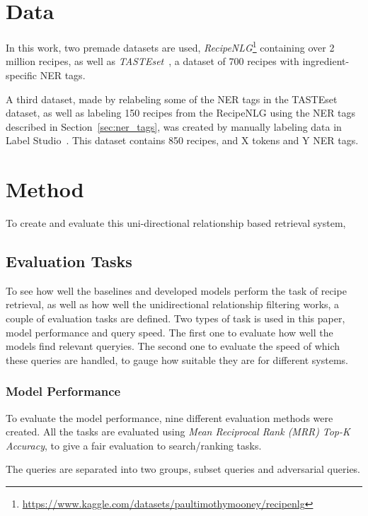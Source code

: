 \documentclass[11pt]{article}
\begin{document}
\section{Data}
In this work, two premade datasets are used,
\emph{RecipeNLG}\footnote{\url{https://www.kaggle.com/datasets/paultimothymooney/recipenlg}}
containing over 2 million recipes, as well as
\emph{TASTEset}~\cite{TASTEset}, a dataset of
700 recipes with ingredient-specific NER tags.

A third dataset, made by relabeling some of the NER tags in the TASTEset dataset,
as well as labeling 150 recipes from the RecipeNLG using the NER tags
described in Section~\ref{sec:ner_tags}, was created by manually labeling
data in Label Studio~\cite{LabelStudio}.
This dataset contains 850 recipes, and X tokens and Y NER tags.

\section{Method}
To create and evaluate this uni-directional relationship based retrieval system, 

\subsection{Evaluation Tasks}
To see how well the baselines and developed models perform the task of recipe
retrieval, as well as how well the unidirectional relationship filtering works,
a couple of evaluation tasks are defined.
Two types of task is used in this paper, model performance and query speed.
The first one to evaluate how well the models find relevant queryies.
The second one to evaluate the speed of which these queries are handled, to
gauge how suitable they are for different systems.

\subsubsection{Model Performance}\label{sec:modelperfomance}
To evaluate the model performance, nine different evaluation methods were
created.
All the tasks are evaluated using \emph{Mean Reciprocal Rank (MRR)} \emph{Top-K
Accuracy}, to give a fair evaluation to search/ranking tasks.

The queries are separated into two groups, subset queries and adversarial
queries.
\end{document}
